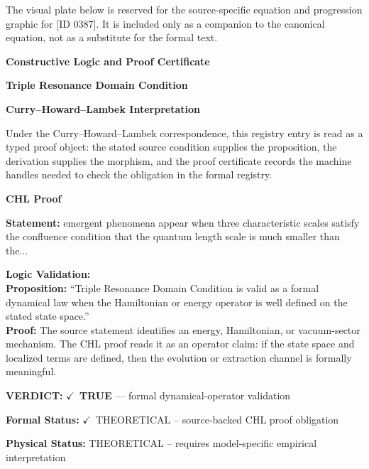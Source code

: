 \begingroup\footnotesize\sloppy
The visual plate below is reserved for the source-specific equation and progression graphic for [ID 0387]. It is included only as a companion to the canonical equation, not as a substitute for the formal text.
\par\endgroup
\ifTZPDarkEdition
{}
\fi

\clearpage
\begingroup\tzpsupportsetup
\noindent\textbf{\fontsize{10.8pt}{12.8pt}\selectfont [ID 0387] Constructive Logic and Proof Certificate}\par
\noindent\textbf{\fontsize{10pt}{12pt}\selectfont Triple Resonance Domain Condition}\par
\vspace{0.45em}
\begingroup
\footnotesize
\setlength{\parskip}{0.22em}
\setlength{\parindent}{0pt}
\noindent\textbf{Curry--Howard--Lambek Interpretation}\par
Under the Curry--Howard--Lambek correspondence, this registry entry is read as a typed proof
object: the stated source condition supplies the proposition, the derivation supplies the
morphism, and the proof certificate records the machine handles needed to check the obligation
in the formal registry.

\vspace{0.45em}
\noindent\textbf{CHL Proof}\par
\textbf{Statement:} emergent phenomena appear when three characteristic scales satisfy the confluence
condition that the quantum length scale is much smaller than the...

\textbf{Logic Validation:}\\
\textbf{Proposition:} ``Triple Resonance Domain Condition is valid as a formal dynamical law when the
Hamiltonian or energy operator is well defined on the stated state space.''\\
\textbf{Proof:} The source statement identifies an energy, Hamiltonian, or vacuum-sector mechanism. The
CHL proof reads it as an operator claim: if the state space and localized terms are
defined, then the evolution or extraction channel is formally meaningful.

\textbf{VERDICT:} \ensuremath{\checkmark}\ \textbf{TRUE} --- formal dynamical-operator validation

\textbf{Formal Status:} \ensuremath{\checkmark}\ THEORETICAL -- source-backed CHL proof obligation

\textbf{Physical Status:} THEORETICAL -- requires model-specific empirical interpretation
\par\vspace{0.45em}
\par
\ifTZPDarkEdition
{}
\fi
\endgroup
\endgroup
